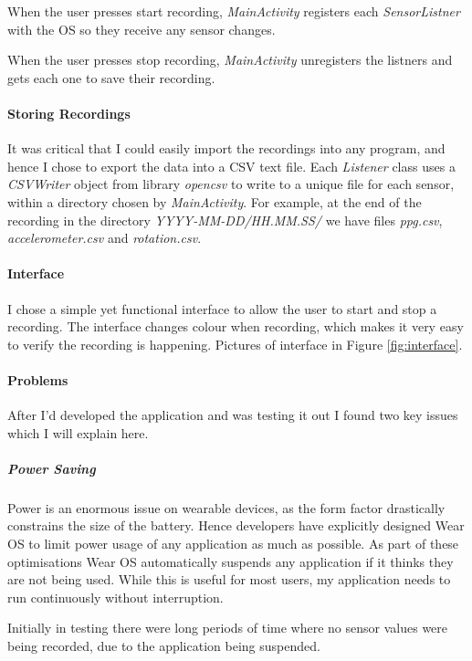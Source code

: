 \documentclass[12pt,a4paper,twoside,openright]{report}
\begin{document}
When the user presses start recording, \emph{MainActivity} registers each
\emph{SensorListner} with the OS so they receive any sensor changes.

When the user presses stop recording, \emph{MainActivity} unregisters the
listners and gets each one to save their recording.

\paragraph{Storing Recordings}

It was critical that I could easily import the recordings into any program, and
hence I chose to export the data into a CSV text file. Each \emph{Listener}
class uses a \emph{CSVWriter} object from library \emph{opencsv} to write to a
unique file for each sensor, within a directory chosen by \emph{MainActivity}.
For example, at the end of the recording in the directory
\emph{YYYY-MM-DD/HH.MM.SS/} we have files \emph{ppg.csv},
\emph{accelerometer.csv} and \emph{rotation.csv}.

\paragraph{Interface}

I chose a simple yet functional interface to allow the user to start and stop
a recording. The interface changes colour when recording, which makes it very
easy to verify the recording is happening. Pictures of interface in Figure
\ref{fig:interface}.

\paragraph{Problems}

After I'd developed the application and was testing it out I found two key
issues which I will explain here.

\subparagraph{Power Saving}

Power is an enormous issue on wearable devices, as the form factor drastically
constrains the size of the battery. Hence developers have explicitly designed
Wear OS to limit power usage of any application as much as possible. 
As part of these optimisations Wear OS automatically suspends any application
if it thinks they are not being used. While this is useful for most users, my
application needs to run continuously without interruption.

Initially in testing there were long periods of time where no sensor values
were being recorded, due to the application being suspended.
\end{document}
